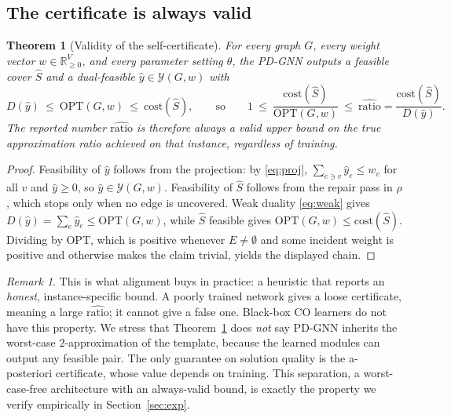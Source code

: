 \documentclass[11pt]{article}
\theoremstyle{plain}
\newtheorem{theorem}{Theorem}
\theoremstyle{definition}
\theoremstyle{remark}
\newtheorem{remark}{Remark}
\newcommand{\OPT}{\mathrm{OPT}}
\newcommand{\cost}{\mathrm{cost}}
\newcommand{\Ycal}{\mathcal{Y}}
\newcommand{\real}{\mathbb{R}}
\newcommand{\ratiohat}{\widehat{\mathrm{ratio}}}
\newcommand{\PDGNN}{\textsc{PD-GNN}}
\begin{document}
\subsection{The certificate is always valid}
\begin{theorem}[Validity of the self-certificate]\label{thm:cert}
For every graph $G$, every weight vector $w\in\real_{\ge0}^V$, and every
parameter setting $\theta$, the \PDGNN{} outputs a feasible cover $\hat S$ and a
dual-feasible $\hat y\in\Ycal(G,w)$ with
\[
D(\hat y)\ \le\ \OPT(G,w)\ \le\ \cost(\hat S),
\qquad\text{so}\qquad
1\ \le\ \frac{\cost(\hat S)}{\OPT(G,w)}\ \le\ \ratiohat=\frac{\cost(\hat S)}{D(\hat y)}.
\]
The reported number $\ratiohat$ is therefore always a valid upper bound on the
true approximation ratio achieved on that instance, regardless of training.
\end{theorem}
\begin{proof}
Feasibility of $\hat y$ follows from the projection: by \eqref{eq:proj},
$\sum_{e\ni v}\hat y_e\le w_v$ for all $v$ and $\hat y\ge 0$, so
$\hat y\in\Ycal(G,w)$. Feasibility of $\hat S$ follows from the repair pass in
$\rho$, which stops only when no edge is uncovered. Weak duality \eqref{eq:weak}
gives $D(\hat y)=\sum_e\hat y_e\le\OPT(G,w)$, while $\hat S$ feasible gives
$\OPT(G,w)\le\cost(\hat S)$. Dividing by $\OPT$, which is positive whenever
$E\neq\emptyset$ and some incident weight is positive and otherwise makes the
claim trivial, yields the displayed chain.
\end{proof}

\begin{remark}\label{rem:honest}
This is what alignment buys in practice: a heuristic that reports an
\emph{honest}, instance-specific bound. A poorly trained network gives a loose
certificate, meaning a large $\ratiohat$; it cannot give a false one. Black-box
CO learners do not have this property. We stress that Theorem~\ref{thm:cert} does
\emph{not} say \PDGNN{} inherits the worst-case $2$-approximation of the
template, because the learned modules can output any feasible pair. The only
guarantee on solution quality is the a-posteriori certificate, whose value
depends on training. This separation, a worst-case-free architecture with an
always-valid bound, is exactly the property we verify empirically in
Section~\ref{sec:exp}.
\end{remark}
\end{document}
